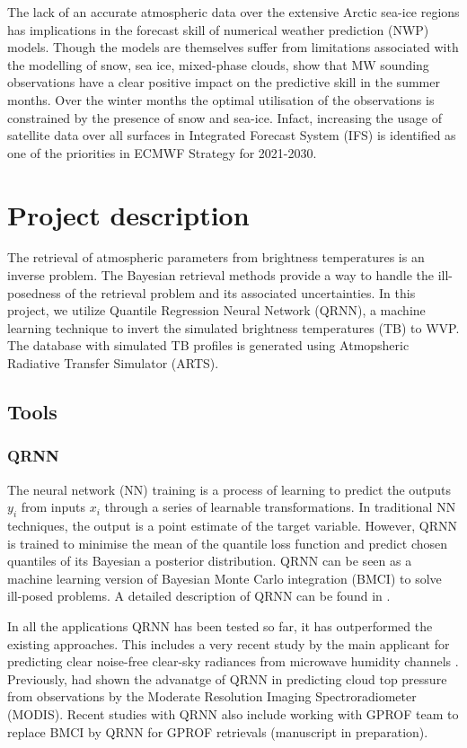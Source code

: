 \documentclass[12pt,oneside,a4paper]{article}
\begin{document}
The lack of an accurate atmospheric data over the extensive Arctic sea-ice regions has implications in the forecast skill of numerical weather prediction (NWP) models. Though the  models are themselves suffer from limitations associated with the modelling of snow, sea ice, mixed-phase clouds, \citet{lawrence:2019:usean} show that MW sounding observations have a clear positive impact on the predictive skill in the summer months. Over the winter months the optimal utilisation of the observations is constrained by the presence of snow and sea-ice. Infact,  increasing the usage of satellite data over all surfaces in Integrated Forecast System (IFS) is identified as one of the priorities in ECMWF Strategy for 2021-2030. 


\section{Project description}

The retrieval of atmospheric parameters from brightness temperatures is an inverse problem. The Bayesian retrieval methods provide a way to handle the ill-posedness of the retrieval problem and its associated uncertainties. In this project, we utilize  Quantile Regression Neural Network (QRNN), a machine learning technique to invert the simulated brightness temperatures (TB) to WVP. The database with simulated TB profiles is generated using Atmopsheric Radiative Transfer Simulator (ARTS). 
 
\subsection{Tools}
\subsubsection{QRNN}
%
\label{sec:qrnn}
The neural network (NN) training is a process of learning to predict the outputs {$y_i$} from inputs {$x_i$} through a series of learnable transformations. In traditional NN techniques, the output is a point estimate of the target variable. However, QRNN is trained to minimise the mean of the quantile loss function and predict chosen quantiles of its Bayesian a posterior distribution. QRNN can be seen as a machine learning version of Bayesian Monte Carlo integration (BMCI) to solve ill-posed problems. A detailed description of QRNN can be found in \citet{pfreundschuh:aneur:18}.  

In all the applications QRNN has been tested so far, it has outperformed the existing approaches. This includes a very recent study by the main applicant for predicting clear noise-free clear-sky radiances from microwave humidity channels \citep{kaur:2021:canma}. Previously, \citet{pfreundschuh:aneur:18} had shown the advanatge of QRNN in predicting cloud top pressure from observations by the Moderate Resolution Imaging Spectroradiometer (MODIS). Recent studies with QRNN also include working with GPROF team  to replace BMCI by QRNN for GPROF retrievals (manuscript in preparation).
\end{document}
